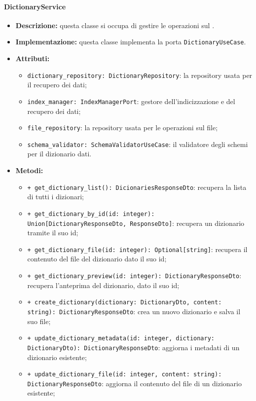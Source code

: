 \paragraph{DictionaryService} \label{DictionaryService}
\begin{itemize}
    \item \textbf{Descrizione:} questa classe si occupa di gestire le operazioni sul . 
    \item \textbf{Implementazione:} questa classe implementa la porta \texttt{DictionaryUseCase}. 
    \item \textbf{Attributi:}
    \begin{itemize}
        \item \texttt{dictionary\_repository: DictionaryRepository}: la repository usata per il recupero dei dati;
        \item \texttt{index\_manager: IndexManagerPort}: gestore dell'indicizzazione e del recupero dei dati;
        \item \texttt{file\_repository}: la repository usata per le operazioni sul file;
        \item \texttt{schema\_validator: SchemaValidatorUseCase}: il validatore degli schemi per il dizionario dati.
    \end{itemize}
    \item \textbf{Metodi:}
    \begin{itemize}
        \item \texttt{+ get\_dictionary\_list(): DicionariesResponseDto}: recupera la lista di tutti i dizionari;
        \item \texttt{+ get\_dictionary\_by\_id(id: integer): Union[DictionaryResponseDto, ResponseDto]}: recupera un dizionario tramite il suo id;
        \item \texttt{+ get\_dictionary\_file(id: integer): Optional[string]}: recupera il contenuto del file del dizionario dato il suo id;
        \item \texttt{+ get\_dictionary\_preview(id: integer): DictionaryResponseDto}: recupera l'anteprima del dizionario, dato il suo id;
        \item \texttt{+ create\_dictionary(dictionary: DictionaryDto, content: string): DictionaryResponseDto}: crea un nuovo dizionario e salva il suo file;
        \item \texttt{+ update\_dictionary\_metadata(id: integer, dictionary: DictionaryDto): DictionaryResponseDto}: aggiorna i metadati di un dizionario esistente;
        \item \texttt{+ update\_dictionary\_file(id: integer, content: string): DictionaryResponseDto}: aggiorna il contenuto del file di un dizionario esistente;

\end{itemize}
\end{itemize}
